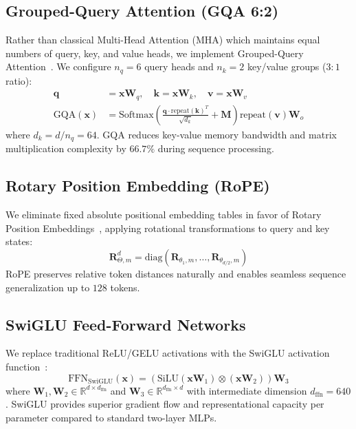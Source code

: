 \documentclass[11pt,a4paper]{article}
\begin{document}
\subsection{Grouped-Query Attention (GQA 6:2)}
Rather than classical Multi-Head Attention (MHA) which maintains equal numbers of query, key, and value heads, we implement Grouped-Query Attention~\cite{ainslie2023gqa}. We configure $n_q=6$ query heads and $n_k=2$ key/value groups ($3:1$ ratio):
\begin{align}
    \mathbf{q} &= \mathbf{x} \mathbf{W}_q, \quad \mathbf{k} = \mathbf{x} \mathbf{W}_k, \quad \mathbf{v} = \mathbf{x} \mathbf{W}_v \\
    \text{GQA}(\mathbf{x}) &= \text{Softmax}\left(\frac{\mathbf{q} \cdot \text{repeat}(\mathbf{k})^T}{\sqrt{d_k}} + \mathbf{M}\right) \text{repeat}(\mathbf{v}) \mathbf{W}_o
\end{align}
where $d_k = d / n_q = 64$. GQA reduces key-value memory bandwidth and matrix multiplication complexity by $66.7\%$ during sequence processing.

\subsection{Rotary Position Embedding (RoPE)}
We eliminate fixed absolute positional embedding tables in favor of Rotary Position Embeddings~\cite{su2024roformer}, applying rotational transformations to query and key states:
\begin{equation}
    \mathbf{R}_{\Theta, m}^d = \text{diag}\left( \mathbf{R}_{\theta_1, m}, \dots, \mathbf{R}_{\theta_{d/2}, m} \right)
\end{equation}
RoPE preserves relative token distances naturally and enables seamless sequence generalization up to $128$ tokens.

\subsection{SwiGLU Feed-Forward Networks}
We replace traditional ReLU/GELU activations with the SwiGLU activation function~\cite{shazeer2020glu}:
\begin{equation}
    \text{FFN}_{\text{SwiGLU}}(\mathbf{x}) = \left(\text{SiLU}(\mathbf{x} \mathbf{W}_1) \otimes (\mathbf{x} \mathbf{W}_2)\right) \mathbf{W}_3
\end{equation}
where $\mathbf{W}_1, \mathbf{W}_2 \in \mathbb{R}^{d \times d_{\text{ffn}}}$ and $\mathbf{W}_3 \in \mathbb{R}^{d_{\text{ffn}} \times d}$ with intermediate dimension $d_{\text{ffn}}=640$. SwiGLU provides superior gradient flow and representational capacity per parameter compared to standard two-layer MLPs.
\end{document}
